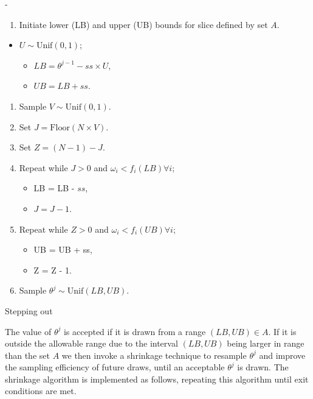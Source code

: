 -\documentclass[article]{jss}
\begin{document}
%
\begin{algorithm}[H]
\begin{enumerate}
\item Initiate lower (LB) and upper (UB) bounds for slice defined by set
$A$.\end{enumerate}
\begin{itemize}
\item $U\sim\mbox{Unif}(0,1)$; 

\begin{itemize}
\item $LB=\theta^{j-1}-ss{\times}U$, 
\item $UB=LB+ss$. 
\end{itemize}
\end{itemize}
\begin{enumerate}
\item Sample $V\sim\mbox{Unif}(0,1)$. 
\item Set $J=\mbox{Floor}(N{\times}V)$. 
\item Set $Z=(N-1)-J$. 
\item Repeat while $J>0$ and $\omega_{i}<f_{i}(LB)\forall i$;

\begin{itemize}
\item LB = LB - $ss$, 
\item $J=J-1$. 
\end{itemize}
\item Repeat while $Z>0$ and $\omega_{i}<f_{i}(UB)\forall i$;

\begin{itemize}
\item UB = UB + ss, 
\item Z = Z - 1. 
\end{itemize}
\item Sample $\theta^{j}\sim\mbox{Unif}(LB,UB)$. 
\end{enumerate}
\caption{Stepping out}
\label{alg:steppingout}
\end{algorithm}


The value of $\theta^{j}$ is accepted if it is drawn from a range
$(LB,UB)\in A$. If it is outside the allowable range due to the
interval $(LB,UB)$ being larger in range than the set $A$ we then
invoke a shrinkage technique to resample $\theta^{j}$ and improve the
sampling efficiency of future draws, until an acceptable $\theta^{j}$
is drawn.  The shrinkage algorithm is implemented as follows,
repeating this algorithm until exit conditions are met.
\end{document}
